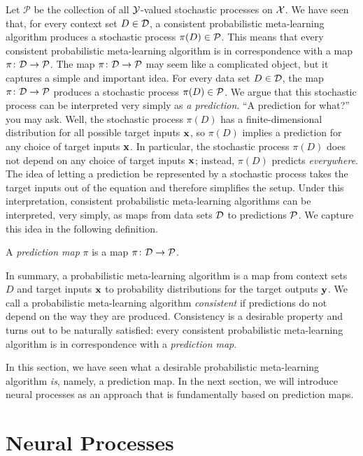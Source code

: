 \documentclass[12pt, twoside]{report}
\begin{document}
Let $\mathcal{P}$ be the collection of all $\mathcal{Y}$-valued stochastic processes on $\mathcal{X}$.
We have seen that, for every context set $D \in \mathcal{D}$, a consistent probabilistic meta-learning algorithm produces a stochastic process $\pi(D) \in \mathcal{P}$.
This means that every consistent probabilistic meta-learning algorithm is in correspondence with a map $\pi\colon \mathcal{D} \to \mathcal{P}$.
The map $\pi\colon \mathcal{D} \to \mathcal{P}$ may seem like a complicated object, but it captures a simple and important idea.
For every data set $D \in \mathcal{D}$, the map $\pi\colon \mathcal{D} \to \mathcal{P}$ produces a stochastic process $\pi(D) \in \mathcal{P}$.
We argue that this stochastic process can be interpreted very simply as \emph{a prediction}.
``A prediction for what?'' you may ask.
Well, the stochastic process $\pi(D)$ has a finite-dimensional distribution for all possible target inputs $\mathbf{x}$, so $\pi(D)$ implies a prediction for any choice of target inputs $\mathbf{x}$. 
In particular, the stochastic process $\pi(D)$ does not depend on any choice of target inputs $\mathbf{x}$;
instead, $\pi(D)$ predicts \emph{everywhere}.
The idea of letting a prediction be represented by a stochastic process takes the target inputs out of the equation and therefore simplifies the setup.
Under this interpretation, consistent probabilistic meta-learning algorithms can be interpreted, very simply, as maps from data sets $\mathcal{D}$ to predictions $\mathcal{P}$.
We capture this idea in the following definition.

\begin{definition}
    \label{def:prediction_map}
    A \emph{prediction map} $\pi$ is a map $\pi\colon \mathcal{D} \to \mathcal{P}$.
\end{definition}

In summary, a probabilistic meta-learning algorithm is a map from context sets $D$ and target inputs $\mathbf{x}$ to probability distributions for the target outputs $\mathbf{y}$.
We call a probabilistic meta-learning algorithm \emph{consistent} if predictions do not depend on the way they are produced.
Consistency is a desirable property
and turns out to be naturally satisfied:
every consistent probabilistic meta-learning algorithm is in correspondence with a \emph{prediction map}.

In this section, we have seen what a desirable probabilistic meta-learning algorithm \emph{is}, namely, a prediction map. 
In the next section, we will introduce neural processes as an approach that is fundamentally based on prediction maps.

\section{Neural Processes}
\label{sec:nps:neural_processes}
\end{document}
